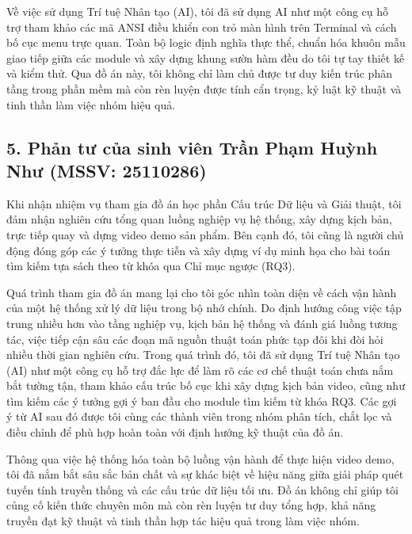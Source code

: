 \documentclass[14pt,a4paper]{extarticle}
\begin{document}
Về việc sử dụng Trí tuệ Nhân tạo (AI), tôi đã sử dụng AI như một công cụ hỗ trợ tham khảo các mã ANSI điều khiển con trỏ màn hình trên Terminal và cách bố cục menu trực quan. Toàn bộ logic định nghĩa thực thể, chuẩn hóa khuôn mẫu giao tiếp giữa các module và xây dựng khung sườn hàm đều do tôi tự tay thiết kế và kiểm thử. Qua đồ án này, tôi không chỉ làm chủ được tư duy kiến trúc phân tầng trong phần mềm mà còn rèn luyện được tính cẩn trọng, kỷ luật kỹ thuật và tinh thần làm việc nhóm hiệu quả.

\subsection*{5. Phản tư của sinh viên Trần Phạm Huỳnh Như (MSSV: 25110286)}

Khi nhận nhiệm vụ tham gia đồ án học phần Cấu trúc Dữ liệu và Giải thuật, tôi đảm nhận nghiên cứu tổng quan luồng nghiệp vụ hệ thống, xây dựng kịch bản, trực tiếp quay và dựng video demo sản phẩm. Bên cạnh đó, tôi cũng là người chủ động đóng góp các ý tưởng thực tiễn và xây dựng ví dụ minh họa cho bài toán tìm kiếm tựa sách theo từ khóa qua Chỉ mục ngược (RQ3).

Quá trình tham gia đồ án mang lại cho tôi góc nhìn toàn diện về cách vận hành của một hệ thống xử lý dữ liệu trong bộ nhớ chính. Do định hướng công việc tập trung nhiều hơn vào tầng nghiệp vụ, kịch bản hệ thống và đánh giá luồng tương tác, việc tiếp cận sâu các đoạn mã nguồn thuật toán phức tạp đôi khi đòi hỏi nhiều thời gian nghiên cứu. Trong quá trình đó, tôi đã sử dụng Trí tuệ Nhân tạo (AI) như một công cụ hỗ trợ đắc lực để làm rõ các cơ chế thuật toán chưa nắm bắt tường tận, tham khảo cấu trúc bố cục khi xây dựng kịch bản video, cũng như tìm kiếm các ý tưởng gợi ý ban đầu cho module tìm kiếm từ khóa RQ3. Các gợi ý từ AI sau đó được tôi cùng các thành viên trong nhóm phân tích, chắt lọc và điều chỉnh để phù hợp hoàn toàn với định hướng kỹ thuật của đồ án.

Thông qua việc hệ thống hóa toàn bộ luồng vận hành để thực hiện video demo, tôi đã nắm bắt sâu sắc bản chất và sự khác biệt về hiệu năng giữa giải pháp quét tuyến tính truyền thống và các cấu trúc dữ liệu tối ưu. Đồ án không chỉ giúp tôi củng cố kiến thức chuyên môn mà còn rèn luyện tư duy tổng hợp, khả năng truyền đạt kỹ thuật và tinh thần hợp tác hiệu quả trong làm việc nhóm.

\newpage
\end{document}
